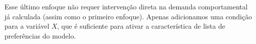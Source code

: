 Esse último enfoque não requer intervenção direta na demanda comportamental já calculada (assim como o primeiro enfoque). Apenas adicionamos uma condição para a variável $X$, que é suficiente para ativar a característica de lista de preferências do modelo.















































